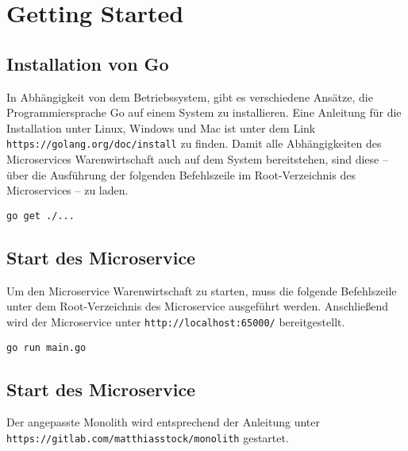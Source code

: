 \section{Getting Started}
\label{sec: Getting Started}

\subsection{Installation von Go}
In Abhängigkeit von dem Betriebssystem, gibt es verschiedene Ansätze, die Programmiersprache Go auf einem System zu installieren. Eine Anleitung für die Installation unter Linux, Windows und Mac ist unter dem Link \texttt{https://golang.org/doc/install} zu finden. Damit alle Abhängigkeiten des Microservices Warenwirtschaft auch auf dem System bereitstehen, sind diese -- über die Ausführung der folgenden Befehlszeile im Root-Verzeichnis des Microservices -- zu laden.
\begin{lstlisting}[caption=Laden der Abhängigkeiten]
go get ./...
\end{lstlisting}

\subsection{Start des Microservice}
Um den Microservice Warenwirtschaft zu starten, muss die folgende Befehlszeile unter dem Root-Verzeichnis des Microservice ausgeführt werden. Anschließend wird der Microservice unter \texttt{http://localhost:65000/} bereitgestellt. 
\begin{lstlisting}[caption=Start des Go-Microservice]
go run main.go
\end{lstlisting}

\subsection{Start des Microservice}
Der angepasste Monolith wird entsprechend der Anleitung unter \texttt{https://gitlab.com/matthiasstock/monolith} gestartet.